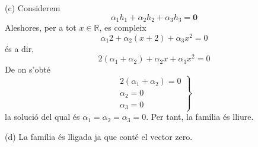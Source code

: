 \begin{solucio}
(c) Considerem%
\begin{equation*}
\alpha _{1}h_{1}+\alpha _{2}h_{2}+\alpha _{3}h_{3}=\mathbf{0}
\end{equation*}%
Aleshores, per a tot $x\in \mathbb{R}$, es compleix%
\begin{equation*}
\alpha _{1}2+\alpha _{2}(x+2)+\alpha _{3}x^{2}=0
\end{equation*}%
és a dir,%
\begin{equation*}
2(\alpha _{1}+\alpha _{2})+\alpha _{2}x+\alpha _{3}x^{2}=0
\end{equation*}%
De on s’obté%
\begin{equation*}
\left.
\begin{array}{r}
2(\alpha _{1}+\alpha _{2})=0 \\
\alpha _{2}=0 \\
\alpha _{3}=0%
\end{array}%
\right\}
\end{equation*}%
la solució del qual és $\alpha _{1}=\alpha _{2}=\alpha _{3}=0$. Per tant, la
família és lliure.

(d) La família és lligada ja que conté el vector zero.
\end{solucio}

